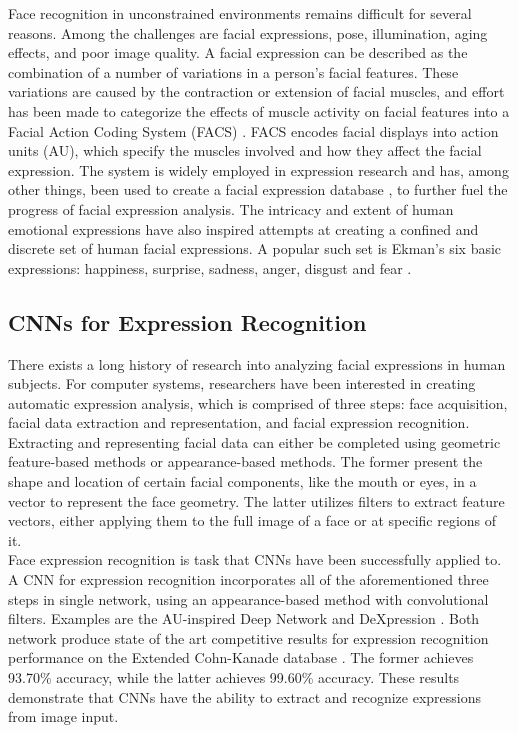 Face recognition in unconstrained environments remains difficult for several reasons. Among the challenges are facial expressions, pose, illumination, aging effects, and poor image quality. A facial expression can be described as the combination of a number of variations in a person's facial features. These variations are caused by the contraction or extension of facial muscles, and effort has been made to categorize the effects of muscle activity on facial features into a Facial Action Coding System (FACS) \cite{facs}. FACS encodes facial displays into action units (AU), which specify the muscles involved and how they affect the facial expression. The system is widely employed in expression research and has, among other things, been used to create a facial expression database \cite{exp_db}, to further fuel the progress of facial expression analysis. The intricacy and extent of human emotional expressions have also inspired attempts at creating a confined and discrete set of human facial expressions. A popular such set is Ekman's six basic expressions: happiness, surprise, sadness, anger, disgust and fear \cite{ekman}.

\subsection{CNNs for Expression Recognition}

There exists a long history of research into analyzing facial expressions in human subjects. For computer systems, researchers have been interested in creating automatic expression analysis, which is comprised of three steps: face acquisition, facial data extraction and representation, and facial expression recognition. Extracting and representing facial data can either be completed using geometric feature-based methods or appearance-based methods. The former present the shape and location of certain facial components, like the mouth or eyes, in a vector to represent the face geometry. The latter utilizes filters to extract feature vectors, either applying them to the full image of a face or at specific regions of it. \\

\noindent Face expression recognition is task that CNNs have been successfully applied to. A CNN for expression recognition incorporates all of the aforementioned three steps in single network, using an appearance-based method with convolutional filters. Examples are the AU-inspired Deep Network \cite{audn} and DeXpression \cite{dexpression}. Both network produce state of the art competitive results for expression recognition performance on the Extended Cohn-Kanade database \cite{ck-plus}. The former achieves 93.70\% accuracy, while the latter achieves 99.60\% accuracy. These results demonstrate that CNNs have the ability to extract and recognize expressions from image input. 

